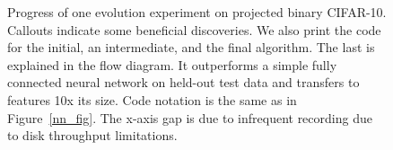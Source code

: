 \begin{figure}[!htp]
%
\createlength{\diagramshift}{92.9pt - \diagramextrawidth}  %
\hspace*{-6pt}
\hspace*{0.2in}%
\caption{Progress of one evolution experiment on projected binary CIFAR-10. Callouts indicate some beneficial discoveries. We also print the code for the initial, an intermediate, and the final algorithm. The last is explained in the flow diagram. It outperforms a simple fully connected neural network on held-out test data and transfers to features 10x its size. Code notation is the same as in Figure~\ref{nn_fig}. The x-axis gap is due to infrequent recording due to disk throughput limitations.}
\label{experiment_progress_fig}
\end{figure}

